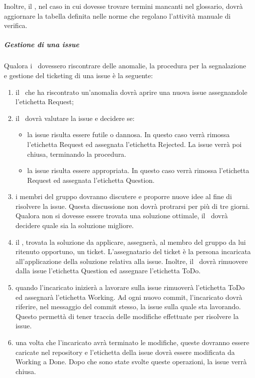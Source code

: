 \documentclass[../NormeProgetto.tex]{subfiles}
\begin{document}
		Inoltre, il \verificatore, nel caso in cui dovesse trovare termini mancanti nel glossario, dovrà aggiornare la tabella definita nelle norme che regolano l'attività manuale di verifica.
			
		\subparagraph{Gestione di una issue}
		Qualora i \verificatori\ dovessero riscontrare delle anomalie, la procedura per la segnalazione e gestione del ticketing di una issue è la seguente:
		\begin{enumerate}
			\item il \verificatore\ che ha riscontrato un'anomalia dovrà aprire una nuova issue assegnandole l'etichetta Request;
			\item il \responsabilediprogetto\ dovrà valutare la issue e decidere se:			\begin{itemize}
				\item la issue risulta essere futile o dannosa. In questo caso verrà rimossa l'etichetta Request ed assegnata l'etichetta Rejected. La issue verrà poi chiusa, terminando la procedura.
				\item la issue risulta essere appropriata. In questo caso verrà rimossa l'etichetta Request ed assegnata l'etichetta Question. 
			\end{itemize}
			\item i membri del gruppo dovranno discutere e proporre nuove idee al fine di risolvere la issue. Questa discussione non dovrà protrarsi per più di tre giorni. Qualora non si dovesse essere trovata una soluzione ottimale, il \responsabilediprogetto\ dovrà decidere quale sia la soluzione migliore.
			\item il \responsabilediprogetto, trovata la soluzione da applicare,  assegnerà, al membro del gruppo da lui ritenuto opportuno, un ticket. L'assegnatario del ticket è la persona incaricata all'applicazione della soluzione relativa alla issue. Inoltre, il \responsabilediprogetto\ dovrà rimuovere dalla issue l'etichetta Question ed assegnare l'etichetta ToDo.
			\item quando l'incaricato inizierà a lavorare sulla issue rimuoverà l'etichetta ToDo ed assegnarà l'etichetta Working. Ad ogni nuovo commit, l'incaricato dovrà riferire, nel messaggio del commit stesso, la issue sulla quale sta lavorando. Questo permettà di tener traccia delle modifiche effettuate per risolvere la issue.
			\item una volta che l'incaricato avrà terminato le modifiche, queste dovranno essere caricate nel repository e l'etichetta della issue dovrà essere modificata da Working a Done. Dopo che sono state svolte queste operazioni, la issue verrà chiusa.
		\end{enumerate}
		
\end{document}
